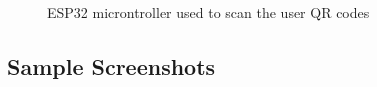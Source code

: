 \begin{figure}[h]
    \caption{ESP32 microntroller used to scan the user QR codes}%
    \label{fig:equip}%
\end{figure}

\subsection{Sample Screenshots}
\begin{figure}[h]%
    \centering
    \qquad

\end{figure}
